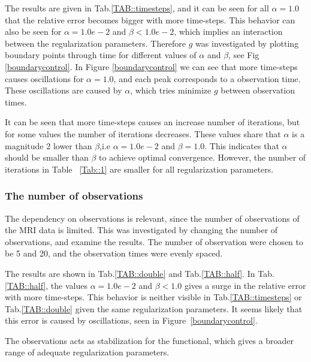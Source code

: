 \documentclass[11pt,a4paper]{article}
\begin{document}
The results are given in Tab.\ref{TAB::timesteps}, and it can be seen for all $\alpha=1.0$ that the relative error becomes bigger with more time-steps. This behavior can also be seen for $\alpha=1.0e-2$ and $\beta < 1.0e-2$, which implies an interaction between the regularization parameters. 
Therefore $g$ was investigated by plotting boundary points through time for different values of $\alpha$ and $\beta$, see Fig \ref{boundarycontrol}. In Figure \ref{boundarycontrol} we can see that more time-steps causes  oscillations for $\alpha=1.0$, and each peak corresponds to a observation time. These oscillations are caused by $\alpha$, which tries minimize $g$ between observation times.

It can be seen that more time-steps causes an increase number of iterations, but for some values the number of iterations decreases. These values share that $\alpha $ is a magnitude 2 lower than $ \beta$,i.e $\alpha=1.0e-2$ and $\beta =1.0$. This indicates that $\alpha $ should be smaller than $\beta$ to achieve optimal convergence. However, the number of iterations in Table ~\ref{Tab::1} are smaller for all regularization parameters. 


\subsubsection{The number of observations}
The dependency on observations is relevant, since the number of observations of the MRI data is limited. This was investigated by changing the number of observations, and examine the results. The number of observation were chosen to be 5 and 20, and the observation times were evenly spaced. 


The results are shown in Tab.\ref{TAB::double} and Tab.\ref{TAB::half}. In Tab.\ref{TAB::half}, the values $\alpha =1.0e-2$ and $\beta<1.0$ gives a surge in the relative error with more time-steps. This behavior is neither visible in Tab.\ref{TAB::timesteps} or Tab.\ref{TAB::double} given the same regularization parameters. It seems likely that this error is caused by oscillations, seen in Figure~\ref{boundarycontrol}.  

The observations acts as stabilization for the functional, which gives a broader range of adequate regularization parameters.

\end{document}
